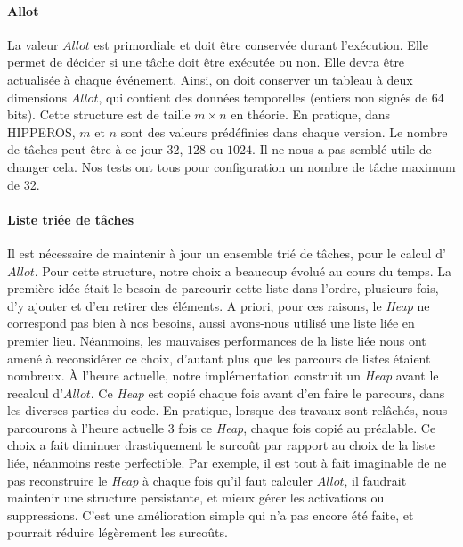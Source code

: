 		\paragraph{Allot}
		La valeur $Allot$ est primordiale et doit être conservée durant l'exécution.
		Elle permet de décider si une tâche doit être exécutée ou non.
		Elle devra être actualisée à chaque événement.
		Ainsi, on doit conserver un tableau à deux dimensions $Allot$, qui contient des données 
		temporelles (entiers non signés de $64$ bits). 
		Cette structure est de taille $m \times n$ en théorie. 
		En pratique, dans HIPPEROS, $m$ et $n$ sont des valeurs prédéfinies 
		dans chaque version. Le nombre de tâches peut être à ce jour $32$, $128$ ou $1024$.
		Il ne nous a pas semblé utile de changer cela. Nos tests ont tous pour configuration 
		un nombre de tâche maximum de 32. 
		\newline
		
		\paragraph{Liste triée de tâches}
		Il est nécessaire de maintenir à jour un ensemble trié de tâches, pour le 
		calcul d'$Allot$. Pour cette structure, notre choix a beaucoup évolué au cours du temps. 
		La première idée était le besoin de parcourir cette liste dans l'ordre, plusieurs fois, 
		d'y ajouter et d'en retirer des éléments. A priori, pour ces raisons, le \textit{Heap} ne 
		correspond pas bien à nos besoins, aussi avons-nous utilisé une liste liée en 
		premier lieu. Néanmoins, les mauvaises performances de la liste liée 
		nous ont amené à reconsidérer ce choix, d'autant plus que les parcours de listes étaient nombreux. 
		À l'heure actuelle, notre implémentation construit un \textit{Heap} avant le recalcul d'$Allot$.
		Ce \textit{Heap} est copié chaque fois avant d'en faire le parcours, dans les diverses parties du code.
		En pratique, lorsque des travaux sont relâchés, nous parcourons à l'heure actuelle 3 fois ce \textit{Heap}, 
		chaque fois copié au préalable. 
		Ce choix a fait diminuer drastiquement le surcoût par rapport au choix de la liste liée, 
		néanmoins reste perfectible.
		Par exemple, il est tout à fait imaginable de ne pas reconstruire le \textit{Heap} à chaque fois qu'il faut 
		calculer $Allot$, il faudrait maintenir une structure persistante, et mieux gérer les activations ou suppressions. 
		C'est une amélioration simple qui n'a pas encore été faite, et pourrait réduire légèrement les surcoûts.
		\newline
		
